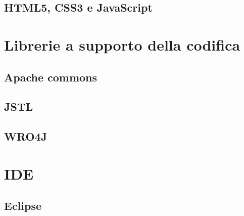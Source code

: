 \subsection{HTML5, CSS3 e JavaScript}


\section{Librerie a supporto della codifica}
\subsection{Apache commons}


\subsection{JSTL}


\subsection{WRO4J}


\section{IDE}
\subsection{Eclipse}
